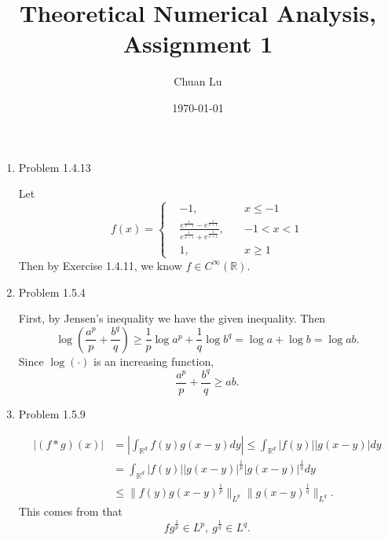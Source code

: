 \documentclass{article}%
\begin{document}
\title{Theoretical Numerical Analysis, Assignment 1}
\author{Chuan Lu}
\date{\today}
\maketitle

\begin{enumerate}

\item Problem 1.4.13

Let 
\begin{equation}
f(x) = \left\{
\begin{aligned}
&-1, \quad& x \le -1 \\
&\frac{e^\frac{1}{x-1}-e^\frac{1}{x+1}}{e^\frac{1}{x-1}+e^\frac{1}{x+1}}, \quad& -1 < x < 1 \\
&1, \quad& x \ge 1
\end{aligned}
\right.
\end{equation}
Then by Exercise 1.4.11, we know $f\in C^\infty(\mathbb{R}) $.

\item Problem 1.5.4

First, by Jensen's inequality we have the given inequality. Then
\begin{equation}
\log\left(
\frac{a^p}{p}+\frac{b^q}{q}
\right)
\ge \frac{1}{p}\log a^p + \frac{1}{q}\log b^q = \log a + \log b = \log ab.
\end{equation}
Since $\log(\cdot) $ is an increasing function, 
\begin{equation}
\frac{a^p}{p}+\frac{b^q}{q} \ge ab.
\end{equation}

\item Problem 1.5.9

\begin{equation}
\begin{aligned}
|(f\ast g)(x)| &= \left|\int_{\mathbb{R}^d}f(y)g(x-y)dy\right| \le \int_{\mathbb{R}^d}|f(y)||g(x-y)|dy \\
&= \int_{\mathbb{R}^d}|f(y)||g(x-y)|^\frac{1}{p}|g(x-y)|^\frac{1}{q}dy \\
&\le \lVert f(y)g(x-y)^\frac{1}{p}\rVert_{L^p}\lVert g(x-y)^\frac{1}{q}\rVert_{L^q}.
\end{aligned}
\end{equation}
This comes from that 
\begin{equation}
fg^{\frac{1}{p}} \in L^p, \ g^{\frac{1}{q}} \in L^q.
\end{equation}


\end{enumerate}
\end{document}

